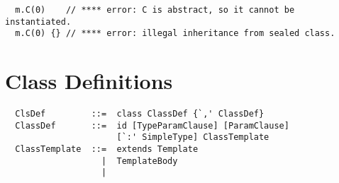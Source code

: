 \documentclass[a4paper,12pt,twoside,titlepage]{book}
\begin{document}
\begin{lstlisting}
  m.C(0)    // **** error: C is abstract, so it cannot be instantiated.
  m.C(0) {} // **** error: illegal inheritance from sealed class.
\end{lstlisting}

\section{Class Definitions}
\label{sec:classes}

\syntax\begin{lstlisting}
  ClsDef         ::=  class ClassDef {`,' ClassDef}
  ClassDef       ::=  id [TypeParamClause] [ParamClause] 
                      [`:' SimpleType] ClassTemplate
  ClassTemplate  ::=  extends Template
                   |  TemplateBody
                   |
\end{lstlisting}
\end{document}
